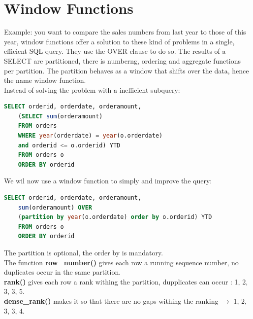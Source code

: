 \documentclass{report}
\begin{document}
	\chapter{Window Functions}
	Example: you want to compare the sales numbers from last year to those of this year, window functions offer a solution to these kind of problems in a single, efficient SQL query. They use the OVER clause to do so. The results of a SELECT are partitioned, there is numberng, ordering and aggregate functions per partition. The partition behaves as a window that shifts over the data, hence the name window function. \\
	Instead of solving the problem with a inefficient subquery: 
	\begin{lstlisting}[language = sql]
	SELECT orderid, orderdate, orderamount,
	(SELECT sum(orderamount)
	FROM orders 
	WHERE year(orderdate) = year(o.orderdate) 
	and orderid <= o.orderid) YTD
	FROM orders o 
	ORDER BY orderid	\end{lstlisting}
	We wil now use a window function to simply and improve the query: 
	\begin{lstlisting}[language=sql]
	SELECT orderid, orderdate, orderamount,
	sum(orderamount) OVER 
	(partition by year(o.orderdate) order by o.orderid) YTD
	FROM orders o
	ORDER BY orderid	\end{lstlisting}	
	The partition is optional, the order by is mandatory. \\The function \textbf{row\_number()} gives each row a running sequence number, no duplicates occur in the same partition. \\ \textbf{rank()} gives each row a rank withing the partition, dupplicates can occur : 1, 2, 3, 3, 5.\\ \textbf{dense\_rank()} makes it so that there are no gaps withing the ranking $\longrightarrow$ 1, 2, 3, 3, 4. 
\end{document}
